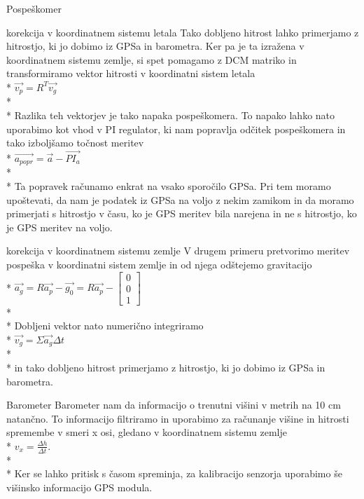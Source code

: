 \documentclass[]{article}
\begin{document}
\begin {subsection}{Pospeškomer}
\begin{subsubsection}{korekcija v koordinatnem sistemu letala}
Tako dobljeno hitrost lahko primerjamo z hitrostjo, ki jo dobimo iz GPSa in barometra. Ker pa je ta izražena v koordinatnem sistemu zemlje, si spet pomagamo z DCM matriko in transformiramo vektor hitrosti v koordinatni sistem letala\\*
$ \vec{v_{p}} = R^{T} \vec{v_{g}} $\\*\\*
Razlika teh vektorjev je tako napaka pospeškomera. To napako lahko nato uporabimo kot vhod v PI regulator, ki nam popravlja odčitek pospeškomera in tako izboljšamo točnost meritev\\*
$ \vec{a_{popr}} = \vec{a} - \vec{PI_{a}} $\\*\\*
Ta popravek računamo enkrat na vsako sporočilo GPSa. Pri tem moramo upoštevati, da nam je podatek iz GPSa na voljo z nekim zamikom in da moramo primerjati s hitrostjo v času, ko je GPS meritev bila narejena in ne s hitrostjo, ko je GPS meritev na voljo.
\begin{subsubsection}{korekcija v koordinatnem sistemu zemlje}
V drugem primeru pretvorimo meritev pospeška v koordinatni sistem zemlje in od njega odštejemo gravitacijo\\*
$ \vec{a_{g}} = R\vec{a_{p}} - \vec{g_{0}} = R\vec{a_{p}} - \left[ \begin{array}{ccc}
0 \\ 
0 \\ 
1
\end{array}\right]   $\\*\\*
Dobljeni vektor nato numerično integriramo\\*
$ \vec{v_{g}} = \Sigma \vec{a_{g}} \Delta t$ \\*\\*
in tako dobljeno hitrost primerjamo z hitrostjo, ki jo dobimo iz GPSa in barometra.


\end{subsubsection}
\end{subsubsection}

\begin {subsection}{Barometer}
Barometer nam da informacijo o trenutni višini v metrih na 10 cm natančno. To informacijo filtriramo in uporabimo za računanje višine in hitrosti spremembe v smeri x osi, gledano v koordinatnem sistemu zemlje\\*
$ v_{x} = \frac{\Delta h}{\Delta t} $.\\*\\*
Ker se lahko pritisk s časom spreminja, za kalibracijo senzorja uporabimo še višinsko informacijo GPS modula.


\end{subsection}
\end{subsection}
\end{document}
